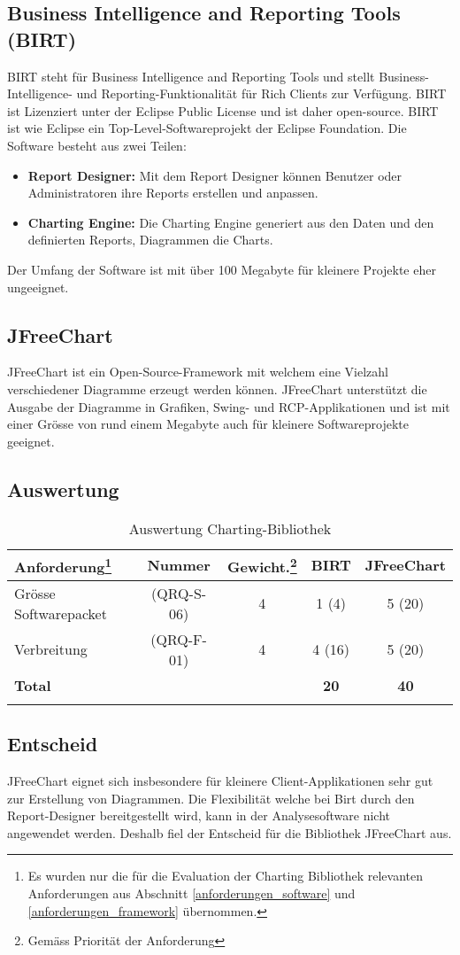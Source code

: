 \subsection{Business Intelligence and Reporting Tools (BIRT)}
BIRT steht für Business Intelligence and Reporting Tools und stellt Business-Intelligence- und Reporting-Funktionalität für Rich Clients zur Verfügung. BIRT ist Lizenziert unter der Eclipse Public License und ist daher open-source. BIRT ist wie Eclipse ein Top-Level-Softwareprojekt der Eclipse Foundation. Die Software besteht aus zwei Teilen:
\begin{itemize}
\item \textbf{Report Designer: }Mit dem Report Designer können Benutzer oder Administratoren ihre Reports erstellen und anpassen. 
\item \textbf{Charting Engine: }Die Charting Engine generiert aus den Daten und den definierten Reports, Diagrammen die Charts.
\end{itemize} 

Der Umfang der Software ist mit über 100 Megabyte für kleinere Projekte eher ungeeignet.

\subsection{JFreeChart}
JFreeChart ist ein Open-Source-Framework mit welchem eine Vielzahl verschiedener Diagramme erzeugt werden können. JFreeChart unterstützt die Ausgabe der Diagramme in Grafiken, Swing- und RCP-Applikationen und ist mit einer Grösse von rund einem Megabyte auch für kleinere Softwareprojekte geeignet.

\subsection{Auswertung}
\begin{longtable}{|p{4cm}|c|c|c|c|}\hline
 \textbf{Anforderung\footnote{Es wurden nur die für die Evaluation der Charting Bibliothek relevanten Anforderungen aus Abschnitt \ref{anforderungen_software} und \ref{anforderungen_framework} übernommen.}} & \textbf{Nummer} &  \textbf{Gewicht.\footnote{Gemäss Priorität der Anforderung}} & \textbf{BIRT} & \textbf{JFreeChart}\\\hline
   Grösse Softwarepacket & (QRQ-S-06) & 4 & 1 (4) & 5 (20) \\\hline
   Verbreitung & (QRQ-F-01) & 4 & 4 (16) & 5 (20) \\\hline
   \textbf{Total} & && \textbf{20}  & \textbf{40} \\\hline
    \caption{Auswertung Charting-Bibliothek}
\end{longtable}

\subsection{Entscheid}
JFreeChart eignet sich insbesondere für kleinere Client-Applikationen sehr gut zur Erstellung von Diagrammen. Die Flexibilität welche bei Birt durch den Report-Designer bereitgestellt wird, kann in der Analysesoftware nicht angewendet werden. Deshalb fiel der Entscheid für die Bibliothek JFreeChart aus.
